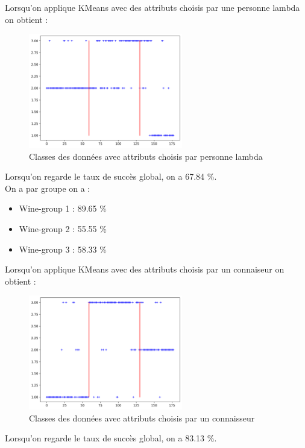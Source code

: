 \documentclass[a4paper,12pt]{article}
\begin{document}
Lorsqu'on applique KMeans avec des attributs choisis par une personne lambda on obtient :

\begin{figure}[h!] %
   \centering
   \includegraphics[width=0.6\textwidth]{normal_atributes.png} %
   \caption{Classes des données avec attributs choisis par personne lambda}
\end{figure}


Lorsqu'on regarde le taux de succès global, on a 67.84 \%.\\

On a par groupe on a :
\begin{itemize}
\item Wine-group 1 : 89.65 \%
\item Wine-group 2 : 55.55 \%
\item Wine-group 3 : 58.33 \%
\end{itemize}

\vspace{10pt}

Lorsqu'on applique KMeans avec des attributs choisis par un connaiseur on obtient :

\begin{figure}[h!] %
   \centering
   \includegraphics[width=0.6\textwidth]{profetional_atributes.png} %
   \caption{Classes des données avec attributs choisis par un connaisseur}
\end{figure}
Lorsqu'on regarde le taux de succès global, on a 83.13 \%.\\
\end{document}
